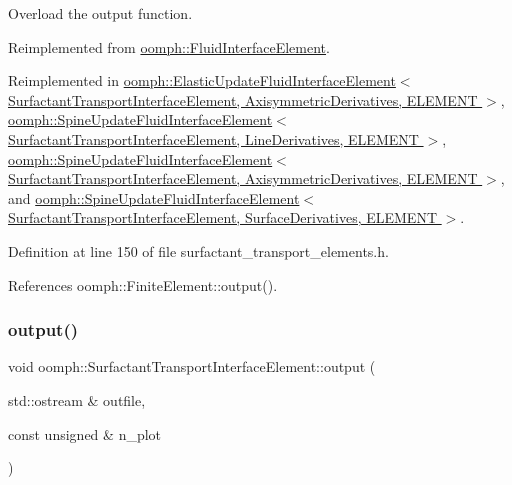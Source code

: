 Overload the output function. 



Reimplemented from \hyperlink{classoomph_1_1FluidInterfaceElement_aba83fbd0679ffca4ef6aa32f7aa5d179}{oomph\+::\+Fluid\+Interface\+Element}.



Reimplemented in \hyperlink{classoomph_1_1ElasticUpdateFluidInterfaceElement_a46b22d178b248355083a3564e4e92eb0}{oomph\+::\+Elastic\+Update\+Fluid\+Interface\+Element$<$ Surfactant\+Transport\+Interface\+Element, Axisymmetric\+Derivatives, E\+L\+E\+M\+E\+N\+T $>$}, \hyperlink{classoomph_1_1SpineUpdateFluidInterfaceElement_ae2875e70d1f8eacc229ea3d4318f7de4}{oomph\+::\+Spine\+Update\+Fluid\+Interface\+Element$<$ Surfactant\+Transport\+Interface\+Element, Line\+Derivatives, E\+L\+E\+M\+E\+N\+T $>$}, \hyperlink{classoomph_1_1SpineUpdateFluidInterfaceElement_ae2875e70d1f8eacc229ea3d4318f7de4}{oomph\+::\+Spine\+Update\+Fluid\+Interface\+Element$<$ Surfactant\+Transport\+Interface\+Element, Axisymmetric\+Derivatives, E\+L\+E\+M\+E\+N\+T $>$}, and \hyperlink{classoomph_1_1SpineUpdateFluidInterfaceElement_ae2875e70d1f8eacc229ea3d4318f7de4}{oomph\+::\+Spine\+Update\+Fluid\+Interface\+Element$<$ Surfactant\+Transport\+Interface\+Element, Surface\+Derivatives, E\+L\+E\+M\+E\+N\+T $>$}.



Definition at line 150 of file surfactant\+\_\+transport\+\_\+elements.\+h.



References oomph\+::\+Finite\+Element\+::output().

\mbox{\label{classoomph_1_1SurfactantTransportInterfaceElement_aebc3ed4954b636f4992a212c7973c670}} 
\subsubsection{\texorpdfstring{output()}{output()}\hspace{0.1cm}{\footnotesize\ttfamily [2/4]}}
{\footnotesize\ttfamily void oomph\+::\+Surfactant\+Transport\+Interface\+Element\+::output (\begin{DoxyParamCaption}\item[{std\+::ostream \&}]{outfile,  }\item[{const unsigned \&}]{n\+\_\+plot }\end{DoxyParamCaption})\hspace{0.3cm}{\ttfamily [virtual]}}



